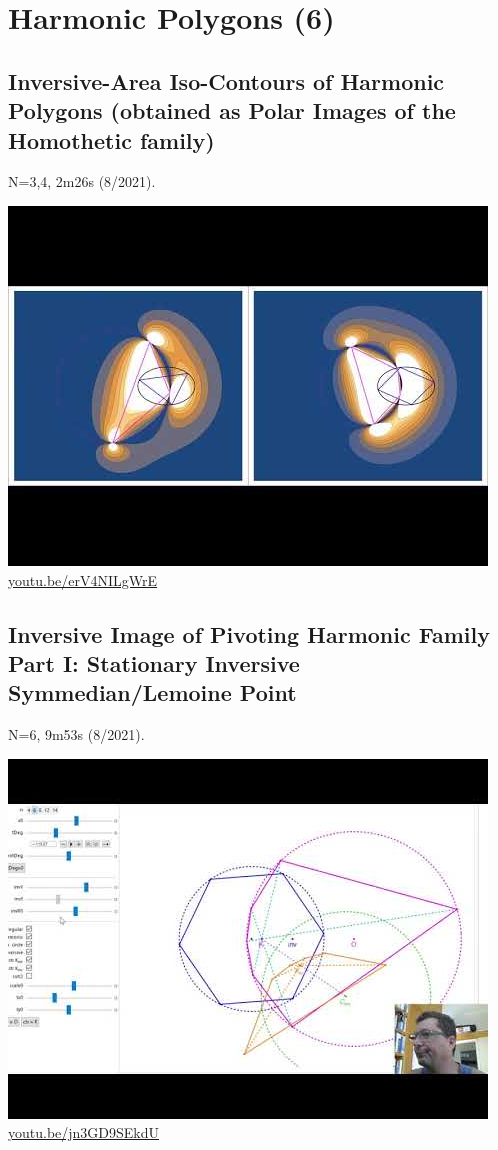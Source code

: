 \documentclass[12pt]{amsart}
\begin{document}
\section{Harmonic Polygons (6)}

\subsection{Inversive-Area Iso-Contours of Harmonic Polygons (obtained as Polar Images of the Homothetic family)}
\label{vid:erV4NILgWrE}
\noindent N=3,4, 2m26s (8/2021). 
\begin{center}\includegraphics[width=.5\textwidth]{pics/erV4NILgWrE.jpg} \\ 
\href{https://youtu.be/erV4NILgWrE}{\url{youtu.be/erV4NILgWrE}}\end{center}
% 
\subsection{Inversive Image of Pivoting Harmonic Family Part I: Stationary Inversive Symmedian/Lemoine Point}
\label{vid:jn3GD9SEkdU}
\noindent N=6, 9m53s (8/2021). 
\begin{center}\includegraphics[width=.5\textwidth]{pics/jn3GD9SEkdU.jpg} \\ 
\href{https://youtu.be/jn3GD9SEkdU}{\url{youtu.be/jn3GD9SEkdU}}\end{center}
% 
\end{document}
